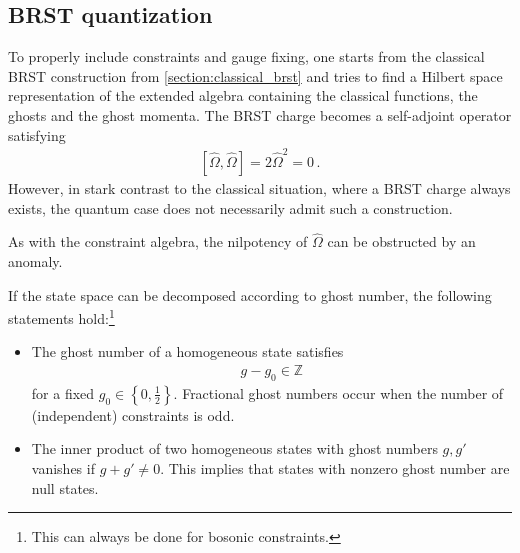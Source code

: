 
\subsection{BRST quantization}

    To properly include constraints and gauge fixing, one starts from the classical BRST construction from \cref{section:classical_brst} and tries to find a Hilbert space representation of the extended algebra containing the classical functions, the ghosts and the ghost momenta. The BRST charge becomes a self-adjoint operator satisfying
    \begin{gather}
        \label{quantization:nilpotent_charge}
        [\widehat{\Omega},\widehat{\Omega}] = 2\widehat{\Omega}^2 = 0\,.
    \end{gather}
    However, in stark contrast to the classical situation, where a BRST charge always exists, the quantum case does not necessarily admit such a construction.

    \begin{remark}
        As with the constraint algebra, the nilpotency of $\widehat{\Omega}$ can be obstructed by an anomaly.
    \end{remark}

    \begin{property}
        If the state space can be decomposed according to ghost number, the following statements hold:\footnote{This can always be done for bosonic constraints.}
        \begin{itemize}
            \item The ghost number of a homogeneous state satisfies
                \begin{gather}
                    g - g_0 \in\mathbb{Z}
                \end{gather}
                for a fixed $g_0\in\left\{0,\frac{1}{2}\right\}$. Fractional ghost numbers occur when the number of (independent) constraints is odd.
            \item The inner product of two homogeneous states with ghost numbers $g,g'$ vanishes if $g+g'\neq0$. This implies that states with nonzero ghost number are null states.
        \end{itemize}
    \end{property}

